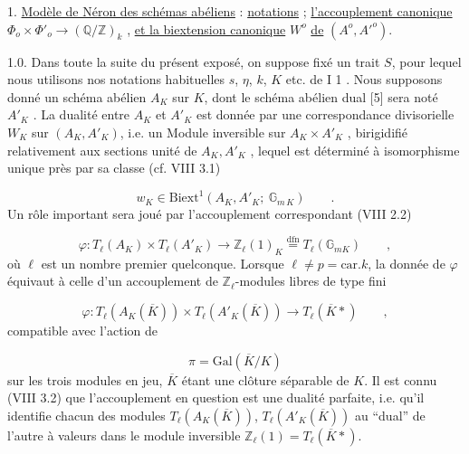 

1. \underline{Modèle de Néron des schémas abéliens} : \underline{notations} ; \underline{l'accouplement canonique} $\Phi_o \times \Phi'_o \longrightarrow (\mathbb{Q}/\mathbb{Z})_k$ , \underline{et la biextension canonique} $W^o$ \underline{de} $(A^o,{A'}^{o})$.

1.0.  Dans toute la suite du présent exposé, on suppose fixé un trait $S$, pour lequel nous utilisons nos notations habituelles $s$, $\eta$, $k$, $K$ etc. de I 1 . Nous supposons donné un schéma abélien $A_K$ sur $K$, dont le schéma abélien dual [5] sera noté $A'_K$ . La dualité entre $A_K$ et $A'_K$ est donnée par une correspondance divisorielle $W_K$ sur $(A_K,A'_K)$, i.e. un Module inversible sur $A_K \times A'_K$ , birigidifié relativement aux sections unité de $A_K,A'_K$ , lequel est déterminé à isomorphisme unique près par sa classe (cf. VIII 3.1)

\begin{equation}\tag{1.0.1}
w_K \in \mathrm{Biext}^1(A_K,A'_K;\ \mathbb{G}_{m\,K}) \qquad .
\end{equation}
Un rôle important sera joué par l'accouplement correspondant (VIII 2.2)

\begin{equation}\tag{1.0.2}
\varphi : T_\ell(A_K) \times T_\ell(A'_K) \longrightarrow \mathbb{Z}_\ell(1)_K \overset{\mathrm{dfn}}{=} T_\ell(\mathbb{G}_{mK}) \qquad ,
\end{equation}
où $\ell$ est un nombre premier quelconque. Lorsque $\ell \neq p = \mathrm{car}.k$, la donnée de $\varphi$ équivaut à celle d'un accouplement de $\mathbb{Z}_\ell$-modules libres de type fini

\begin{equation}\tag{1.0.3}
\varphi : T_\ell(A_K(\overline{K})) \times T_\ell(A'_K(\overline{K})) \longrightarrow T_\ell(\overline{K}*) \qquad ,
\end{equation}
compatible avec l'action de

\begin{equation*}
\pi = \mathrm{Gal}(\overline{K}/K)
\end{equation*}
sur les trois modules en jeu, $\overline{K}$ étant une clôture séparable de $K$. Il est connu (VIII 3.2) que l'accouplement en question est une dualité parfaite, i.e.  qu'il  identifie chacun des modules $T_\ell(A_K(\overline{K}))$, $T_\ell(A'_K(\overline{K}))$ au ``dual'' de l'autre à valeurs dans le module inversible $\mathbb{Z}_\ell(1) = T_\ell(\overline{K}*)$.


